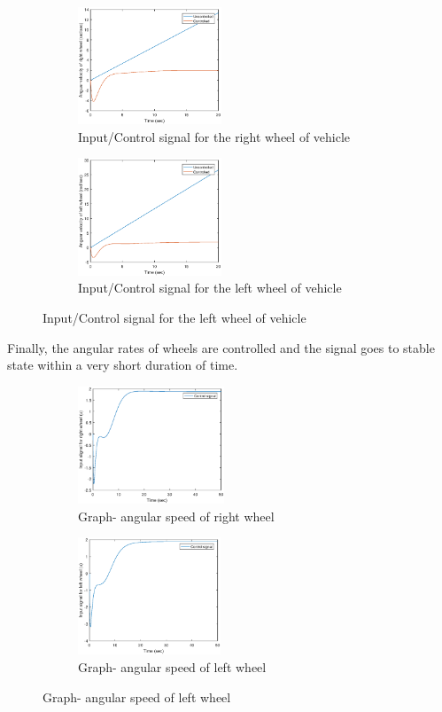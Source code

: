 \documentclass[12pt]{article}
\begin{document}
\begin{figure}[H]
\begin{subfigure}{0.5\textwidth}
\includegraphics[width=0.7\linewidth, height=3.5cm]{control_on_right_wheel.eps}
\captionsetup{labelformat=empty}
\caption{Input/Control signal for the right wheel of vehicle}
\end{subfigure}
\begin{subfigure}{0.5\textwidth}
\includegraphics[width=0.7\linewidth, height=3.5cm]{control_on_left_wheel.eps}
\captionsetup{labelformat=empty}
\caption{Input/Control signal for the left wheel of vehicle}
\end{subfigure}
\end{figure}
Finally, the angular rates of wheels are controlled and the signal goes to stable state within a very short duration of time.
\begin{figure}[H]
\begin{subfigure}{0.5\textwidth}
\includegraphics[width=0.7\linewidth, height=3.5cm]{state_theta_r_dot.eps}
\captionsetup{labelformat=empty}
\caption{Graph- angular speed of right wheel}
\end{subfigure}
\begin{subfigure}{0.5\textwidth}
\includegraphics[width=0.7\linewidth, height=3.5cm]{state_theta_l_dot.eps}
\captionsetup{labelformat=empty}
\caption{Graph- angular speed of left wheel}
\end{subfigure}
\end{figure}
\newpage
\end{document}
